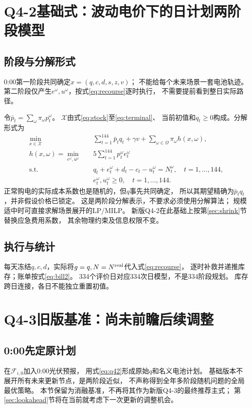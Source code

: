 \documentclass[UTF8,11pt]{ctexart}
\begin{document}
\section{Q4-2基础式：波动电价下的日计划两阶段模型}
\subsection{阶段与分解形式}
0:00第一阶段共同确定$x=(q,c,d,s,z,v)$；
不能给每个未来场景一套电池轨迹。
第二阶段仅产生$e^\omega,u^\omega$，按式\eqref{eq:recourse}逐时执行，
不需要提前看到整日实际路径。

令$\bar p_t=\sum_\omega\pi_\omega p_t^\omega$。
$\mathcal X$由式\eqref{eq:stock}至\eqref{eq:terminal}、
当前初值和$q_t\geq0$构成。分解形式为
\begin{align}
 \min_{x\in\mathcal X}\quad&
       \sum_{t=1}^{144}\bar p_tq_t+\gamma v
           +\sum_{\omega\in\Omega}\pi_\omega h(x,\omega),\label{eq:q42}\\
 h(x,\omega)=\min_{e^\omega,u^\omega}\quad&
             5\sum_{t=1}^{144}p_t^\omega e_t^\omega\\
 \text{s.t.}\quad&
 q_t+e_t^\omega+d_t-c_t-u_t^\omega=N_t^\omega,\quad t=1,\ldots,144,\\
 &e_t^\omega,u_t^\omega\geq0,\quad t=1,\ldots,144.
\end{align}
正常购电的实际成本系数也是随机的，但$q$事先共同确定，
所以其期望精确为$\bar p_tq_t$，并非假设价格已锁定。
这是两阶段分解表示，不要求必须使用分解算法；
规模适中时可直接求解场景展开的LP/MILP。
新版Q4-2在此基础上按第\ref{sec:shrink}节替换应急费用系数，
其余物理约束及信息权限不变。

\subsection{执行与统计}
每天冻结$q,c,d$，实际将$g=q,N=N^{\rm real}$代入式\eqref{eq:recourse}，
逐时补救并递推库存；账单按式\eqref{eq:bill2}。
334个评价日对应334次日模型，不是334阶段规划。
库存跨日连接，各日不能独立重置初值。

\section{Q4-3旧版基准：尚未前瞻后续调整}
\subsection{0:00先定原计划}
在$\mathcal F_{i,0}$加入0:00光伏预报，
用式\eqref{eq:q42}形成原始$q$和名义电池计划。
基础版本不展开所有未来更新节点，是两阶段近似，
不声称得到全年多阶段随机问题的全局最优策略。
本节保留为消融基准，不再将其作为新版Q4-3的最终推荐主式；
第\ref{sec:lookahead}节将在当前就考虑下一次更新的调整机会。
\end{document}
